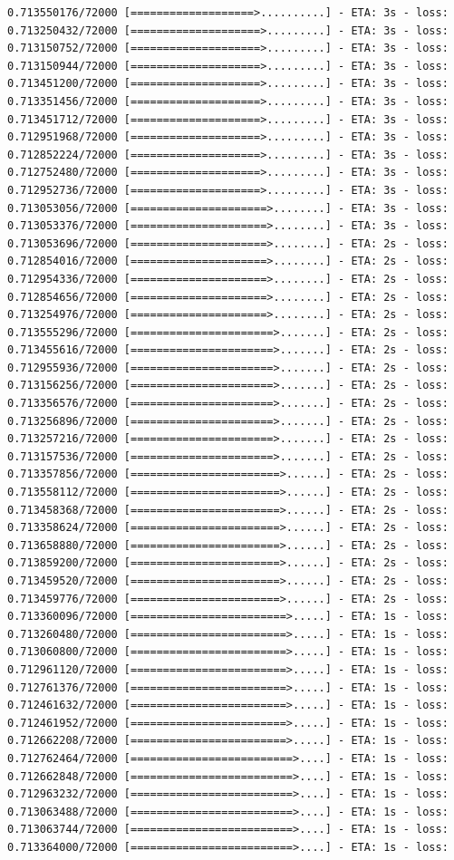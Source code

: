 \documentclass[12pt,fleqn]{article}\usepackage{../../common}
\begin{document}
\begin{verbatim}
0.713550176/72000 [===================>..........] - ETA: 3s - loss: 0.713250432/72000 [====================>.........] - ETA: 3s - loss: 0.713150752/72000 [====================>.........] - ETA: 3s - loss: 0.713150944/72000 [====================>.........] - ETA: 3s - loss: 0.713451200/72000 [====================>.........] - ETA: 3s - loss: 0.713351456/72000 [====================>.........] - ETA: 3s - loss: 0.713451712/72000 [====================>.........] - ETA: 3s - loss: 0.712951968/72000 [====================>.........] - ETA: 3s - loss: 0.712852224/72000 [====================>.........] - ETA: 3s - loss: 0.712752480/72000 [====================>.........] - ETA: 3s - loss: 0.712952736/72000 [====================>.........] - ETA: 3s - loss: 0.713053056/72000 [=====================>........] - ETA: 3s - loss: 0.713053376/72000 [=====================>........] - ETA: 3s - loss: 0.713053696/72000 [=====================>........] - ETA: 2s - loss: 0.712854016/72000 [=====================>........] - ETA: 2s - loss: 0.712954336/72000 [=====================>........] - ETA: 2s - loss: 0.712854656/72000 [=====================>........] - ETA: 2s - loss: 0.713254976/72000 [=====================>........] - ETA: 2s - loss: 0.713555296/72000 [======================>.......] - ETA: 2s - loss: 0.713455616/72000 [======================>.......] - ETA: 2s - loss: 0.712955936/72000 [======================>.......] - ETA: 2s - loss: 0.713156256/72000 [======================>.......] - ETA: 2s - loss: 0.713356576/72000 [======================>.......] - ETA: 2s - loss: 0.713256896/72000 [======================>.......] - ETA: 2s - loss: 0.713257216/72000 [======================>.......] - ETA: 2s - loss: 0.713157536/72000 [======================>.......] - ETA: 2s - loss: 0.713357856/72000 [=======================>......] - ETA: 2s - loss: 0.713558112/72000 [=======================>......] - ETA: 2s - loss: 0.713458368/72000 [=======================>......] - ETA: 2s - loss: 0.713358624/72000 [=======================>......] - ETA: 2s - loss: 0.713658880/72000 [=======================>......] - ETA: 2s - loss: 0.713859200/72000 [=======================>......] - ETA: 2s - loss: 0.713459520/72000 [=======================>......] - ETA: 2s - loss: 0.713459776/72000 [=======================>......] - ETA: 2s - loss: 0.713360096/72000 [========================>.....] - ETA: 1s - loss: 0.713260480/72000 [========================>.....] - ETA: 1s - loss: 0.713060800/72000 [========================>.....] - ETA: 1s - loss: 0.712961120/72000 [========================>.....] - ETA: 1s - loss: 0.712761376/72000 [========================>.....] - ETA: 1s - loss: 0.712461632/72000 [========================>.....] - ETA: 1s - loss: 0.712461952/72000 [========================>.....] - ETA: 1s - loss: 0.712662208/72000 [========================>.....] - ETA: 1s - loss: 0.712762464/72000 [=========================>....] - ETA: 1s - loss: 0.712662848/72000 [=========================>....] - ETA: 1s - loss: 0.712963232/72000 [=========================>....] - ETA: 1s - loss: 0.713063488/72000 [=========================>....] - ETA: 1s - loss: 0.713063744/72000 [=========================>....] - ETA: 1s - loss: 0.713364000/72000 [=========================>....] - ETA: 1s - loss: 
\end{verbatim}
\end{document}
